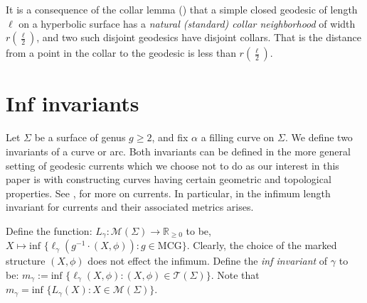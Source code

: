 \documentclass[12pt]{amsart}
\numberwithin{equation}{section}
\theoremstyle{plain}
\begin{document}
 It is a consequence of the collar lemma (\cite{buser2010geometry})
 that a simple closed geodesic of length $\ell$ on a hyperbolic surface has a {\it natural (standard) collar neighborhood} of width 
 $r\left(\frac{\ell}{2}\right)$, and two such disjoint geodesics have disjoint collars. That is the distance from a point in the collar to the geodesic  is less than 
  $r\left(\frac{\ell}{2}\right)$.
 









\section{Inf invariants} \label{sec: Min  invariants}

Let $\Sigma$ be a surface of genus $g\geq 2$, and fix $\alpha$ a filling curve on $\Sigma$. We define two invariants of a curve or arc.  Both invariants can be defined in the more general setting of geodesic currents which we choose not to do as our interest in this paper is with constructing curves having certain geometric and topological properties. See  \cite{bonahon1988geometry}, \cite{hensel2023projection} for more on currents. In particular, in \cite{hensel2023projection}  the infimum length invariant for currents and their associated metrics arises. 


Define the function:
$L_{\gamma} : \mathcal{M}(\Sigma) \rightarrow  \mathbb{R}_{\geq 0}$ to be, 
$X \mapsto \text{inf }\{ \ell_{\gamma} (g^{-1} \cdot (X,\phi)): 
g \in \text{MCG}\}$. Clearly, the choice of the marked structure  
$(X, \phi)$ does not effect the infimum. 
Define the {\it inf  invariant} of $\gamma$ to be: 
$m_{\gamma}:=
\text{inf }\{ \ell_{\gamma} (X, \phi): (X,\phi) \in \mathcal{T}(\Sigma)\}$.
Note that 
$m_{\gamma}=\text{inf }\{L_{\gamma}(X): X \in \mathcal{M}(\Sigma)\}$.
\end{document}
